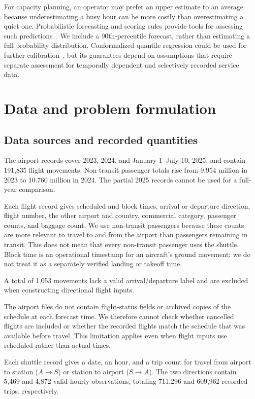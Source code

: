 \documentclass[preprint,12pt,times]{elsarticle}
\newcommand{\AS}{\ensuremath{A\!\rightarrow\!S}}
\newcommand{\SA}{\ensuremath{S\!\rightarrow\!A}}
\begin{document}
For capacity planning, an operator may prefer an upper estimate to an average because underestimating a busy hour can be more costly than overestimating a quiet one. Probabilistic forecasting and scoring rules provide tools for assessing such predictions~\cite{scoring,probforecast}. We include a 90th-percentile forecast, rather than estimating a full probability distribution. Conformalized quantile regression could be used for further calibration~\cite{conformal}, but its guarantees depend on assumptions that require separate assessment for temporally dependent and selectively recorded service data.

\section{Data and problem formulation}
\subsection{Data sources and recorded quantities}

The airport records cover 2023, 2024, and January 1--July 10, 2025, and contain 191,835 flight movements. Non-transit passenger totals rise from 9.954 million in 2023 to 10.760 million in 2024. The partial 2025 records cannot be used for a full-year comparison.

Each flight record gives scheduled and block times, arrival or departure direction, flight number, the other airport and country, commercial category, passenger counts, and baggage count. We use non-transit passengers because these counts are more relevant to travel to and from the airport than passengers remaining in transit. This does not mean that every non-transit passenger uses the shuttle. Block time is an operational timestamp for an aircraft's ground movement; we do not treat it as a separately verified landing or takeoff time.

A total of 1,053 movements lack a valid arrival/departure label and are excluded when constructing directional flight inputs.

The airport files do not contain flight-status fields or archived copies of the schedule at each forecast time. We therefore cannot check whether cancelled flights are included or whether the recorded flights match the schedule that was available before travel. This limitation applies even when flight inputs use scheduled rather than actual times.

Each shuttle record gives a date, an hour, and a trip count for travel from airport to station (\AS) or station to airport (\SA). The two directions contain 5,469 and 4,872 valid hourly observations, totaling 711,296 and 609,962 recorded trips, respectively.
\end{document}
